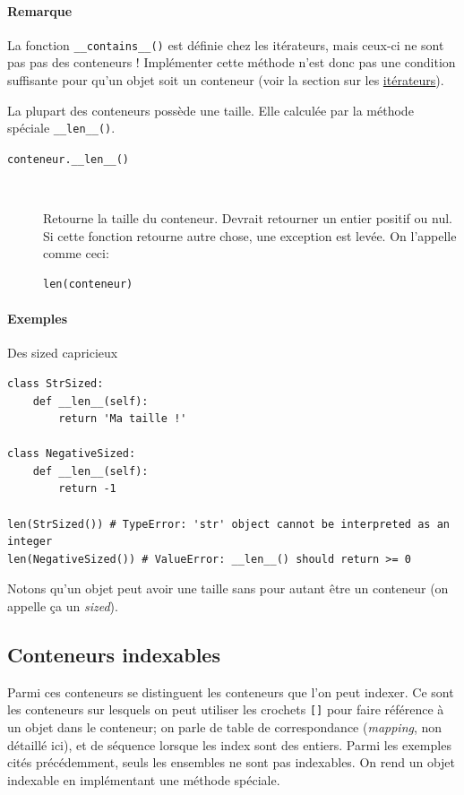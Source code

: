 \documentclass[a4paper, 10pt]{article}
\begin{document}
\paragraph{Remarque} La fonction \texttt{__contains__()} est définie chez les itérateurs, mais ceux-ci ne sont pas pas des conteneurs ! Implémenter cette méthode n'est donc pas une condition suffisante pour qu'un objet soit un conteneur (voir la section sur les \hyperref[iterateur]{itérateurs}).\bigskip

La plupart des conteneurs possède une taille. Elle calculée par la méthode spéciale \texttt{__len__()}.
\begin{description}
    \item[\texttt{conteneur.__len__()}]~

    Retourne la taille du conteneur. Devrait retourner un entier positif ou nul. Si cette fonction retourne autre chose, une exception est levée. On l'appelle comme ceci:
    \begin{verbatim}
len(conteneur)
    \end{verbatim}
\end{description}
\paragraph{Exemples} Des \og sized \fg{} capricieux
\begin{verbatim}
class StrSized:
    def __len__(self):
        return 'Ma taille !'

class NegativeSized:
    def __len__(self):
        return -1

len(StrSized()) # TypeError: 'str' object cannot be interpreted as an integer
len(NegativeSized()) # ValueError: __len__() should return >= 0
\end{verbatim}

Notons qu'un objet peut avoir une taille sans pour autant être un conteneur (on appelle ça un \emph{sized}).

\subsection{Conteneurs indexables}
Parmi ces conteneurs se distinguent les conteneurs que l'on peut indexer. Ce sont les conteneurs sur lesquels on peut utiliser les crochets \texttt{[]} pour faire référence à un objet dans le conteneur; on parle de table de correspondance (\emph{mapping}, non détaillé ici), et de séquence lorsque les index sont des entiers. Parmi les exemples cités précédemment, seuls les ensembles ne sont pas indexables. On rend un objet indexable en implémentant une méthode spéciale.
\end{document}
